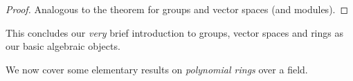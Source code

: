 \documentclass[../../book.tex]{subfiles}
\begin{document}
\begin{proof}
    Analogous to the theorem for groups and vector spaces (and modules). 
\end{proof}

\begin{rmk}
    This concludes our \emph{very} brief introduction to 
    groups, vector spaces and rings as our basic algebraic objects. 
    
    We now cover some elementary results on \emph{polynomial rings} over a field.
\end{rmk}
\end{document}
